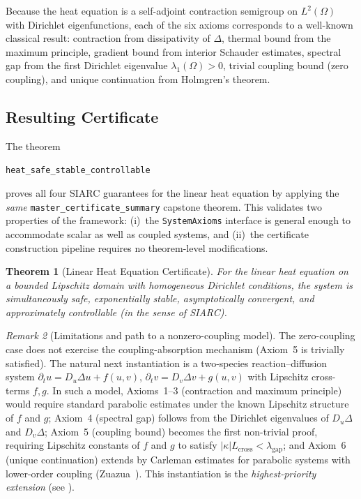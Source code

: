 \documentclass[11pt,a4paper]{article}
\theoremstyle{plain}
\newtheorem{theorem}{Theorem}[section]
\theoremstyle{definition}
\theoremstyle{remark}
\newtheorem{remark}[theorem]{Remark}
\newcommand{\abs}[1]{\lvert #1 \rvert}
\newcommand{\kk}{\kappa}
\newcommand{\leaninline}[1]{\texttt{#1}}
\begin{document}
Because the heat equation is a self-adjoint contraction semigroup on
$L^2(\Omega)$ with Dirichlet eigenfunctions, each of the six axioms
corresponds to a well-known classical result: contraction from
dissipativity of $\Delta$, thermal bound from the maximum principle,
gradient bound from interior Schauder estimates, spectral gap from the
first Dirichlet eigenvalue $\lambda_1(\Omega) > 0$, trivial coupling
bound (zero coupling), and unique continuation from Holmgren's theorem.

\subsection{Resulting Certificate}

The theorem
\begin{center}
\leaninline{heat\_safe\_stable\_controllable}
\end{center}
proves all four SIARC guarantees for the linear heat equation by
applying the \emph{same} \leaninline{master\_certificate\_summary}
capstone theorem.  This validates two properties of the framework:
(i)~the \leaninline{SystemAxioms} interface is general enough to
accommodate scalar as well as coupled systems, and (ii)~the certificate
construction pipeline requires no theorem-level modifications.

\begin{theorem}[Linear Heat Equation Certificate]\label{thm:heat}
For the linear heat equation on a bounded Lipschitz domain with
homogeneous Dirichlet conditions, the system is simultaneously safe,
exponentially stable, asymptotically convergent, and approximately
controllable (in the sense of SIARC).
\end{theorem}

\begin{remark}[Limitations and path to a nonzero-coupling model]\label{rem:heat-limit}
The zero-coupling case does not exercise the coupling-absorption
mechanism (Axiom~5 is trivially satisfied).  The natural next
instantiation is a two-species reaction--diffusion system
$\partial_t u = D_u \Delta u + f(u,v)$,
$\partial_t v = D_v \Delta v + g(u,v)$
with Lipschitz cross-terms $f, g$.  In such a model, Axioms~1--3
(contraction and maximum principle) would require standard parabolic
estimates under the known Lipschitz structure of $f$ and $g$;
Axiom~4 (spectral gap) follows from the Dirichlet eigenvalues of
$D_u \Delta$ and $D_v \Delta$; Axiom~5 (coupling bound) becomes the
first non-trivial proof, requiring Lipschitz constants of $f$ and $g$
to satisfy $\abs{\kk} L_{\mathrm{cross}} < \lambda_{\mathrm{gap}}$;
and Axiom~6 (unique continuation) extends by Carleman estimates for
parabolic systems with lower-order coupling (Zuazua~\cite{Zuazua2007}).
This instantiation is the \emph{highest-priority extension}
(see ).
\end{remark}
\end{document}
